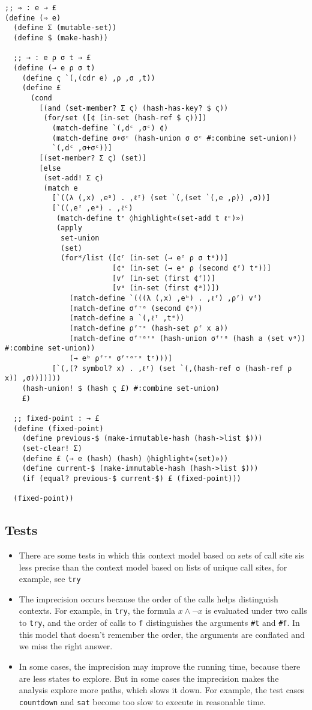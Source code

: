\documentclass[12pt, oneside]{book}
\begin{document}
\begin{Verbatim}
;; ⇒ : e → £
(define (⇒ e)
  (define Σ (mutable-set))
  (define $ (make-hash))

  ;; → : e ρ σ t → £
  (define (→ e ρ σ t)
    (define ς `(,(cdr e) ,ρ ,σ ,t))
    (define £
      (cond
        [(and (set-member? Σ ς) (hash-has-key? $ ς))
         (for/set ([¢ (in-set (hash-ref $ ς))])
           (match-define `(,dᶜ ,σᶜ) ¢)
           (match-define σ+σᶜ (hash-union σ σᶜ #:combine set-union))
           `(,dᶜ ,σ+σᶜ))]
        [(set-member? Σ ς) (set)]
        [else
         (set-add! Σ ς)
         (match e
           [`((λ (,x) ,eᵇ) . ,ℓᶠ) (set `(,(set `(,e ,ρ)) ,σ))]
           [`((,eᶠ ,eᵃ) . ,ℓᶜ)
            (match-define tᵉ ◊highlight«(set-add t ℓᶜ)»)
            (apply
             set-union
             (set)
             (for*/list ([¢ᶠ (in-set (→ eᶠ ρ σ tᵉ))]
                         [¢ᵃ (in-set (→ eᵃ ρ (second ¢ᶠ) tᵉ))]
                         [vᶠ (in-set (first ¢ᶠ))]
                         [vᵃ (in-set (first ¢ᵃ))])
               (match-define `(((λ (,x) ,eᵇ) . ,ℓᶠ) ,ρᶠ) vᶠ)
               (match-define σᶠ⁺ᵃ (second ¢ᵃ))
               (match-define a `(,ℓᶠ ,tᵉ))
               (match-define ρᶠ⁺ˣ (hash-set ρᶠ x a))
               (match-define σᶠ⁺ᵃ⁺ˣ (hash-union σᶠ⁺ᵃ (hash a (set vᵃ)) #:combine set-union))
               (→ eᵇ ρᶠ⁺ˣ σᶠ⁺ᵃ⁺ˣ tᵉ)))]
           [`(,(? symbol? x) . ,ℓʳ) (set `(,(hash-ref σ (hash-ref ρ x)) ,σ))])]))
    (hash-union! $ (hash ς £) #:combine set-union)
    £)

  ;; fixed-point : → £
  (define (fixed-point)
    (define previous-$ (make-immutable-hash (hash->list $)))
    (set-clear! Σ)
    (define £ (→ e (hash) (hash) ◊highlight«(set)»))
    (define current-$ (make-immutable-hash (hash->list $)))
    (if (equal? previous-$ current-$) £ (fixed-point)))

  (fixed-point))
\end{Verbatim}

\subsection{Tests}

\begin{itemize}
  \item There are some tests in which this context model based on sets of call site sis less precise than the context model based on lists of unique call sites, for example, see \texttt{try}
  \item The imprecision occurs because the order of the calls helps distinguish contexts. For example, in \texttt{try}, the formula \(x ∧ ¬x\) is evaluated under two calls to \texttt{try}, and the order of calls to \texttt{f} distinguishes the arguments \texttt{\#t} and \texttt{\#f}. In this model that doesn’t remember the order, the arguments are conflated and we miss the right answer.
  \item In some cases, the imprecision may improve the running time, because there are less states to explore. But in some cases the imprecision makes the analysis explore more paths, which slows it down. For example, the test cases \texttt{countdown} and \texttt{sat} become too slow to execute in reasonable time.
\end{itemize}
\end{document}
